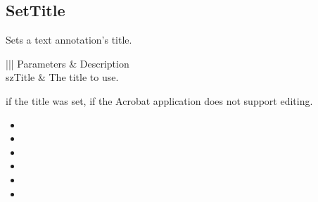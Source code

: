 \documentclass[letterpaper,12pt,english,openany,oneside]{sphinxmanual}
\begin{document}
\subsection{SetTitle}
\label{\detokenize{IAC_API_OLE_Objects:settitle-1}}\label{\detokenize{IAC_API_OLE_Objects:id10}}
Sets a text annotation’s title.


\begin{sphinxVerbatim}[commandchars=\\\{\}]
  
\end{sphinxVerbatim}
\label{\detokenize{IAC_API_OLE_Objects:parameters-46}}


\begin{savenotes}\sphinxattablestart
\centering
{}\label{\detokenize{IAC_API_OLE_Objects:section-51}}\nobreak
\begin{tabular}[t]{|||}
\hline
\sphinxstyletheadfamily 
Parameters
&\sphinxstyletheadfamily 
Description
\\
\hline
szTitle
&
The title to use.
\\
\hline
\end{tabular}
\par
\sphinxattableend\end{savenotes}


 if the title was set,  if the Acrobat application does not support editing.

\label{\detokenize{IAC_API_OLE_Objects:related-methods-81}}
\begin{itemize}
\item {} 
 

\item {} 
 

\item {} 
 

\item {} 
 

\item {} 
 

\item {} 
 

\end{itemize}
\end{document}
